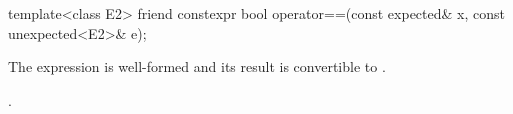 %
\begin{itemdecl}
template<class E2>
  friend constexpr bool operator==(const expected& x, const unexpected<E2>& e);
\end{itemdecl}

\begin{itemdescr}
\pnum
\mandates
The expression  is well-formed and its result is convertible to .

\pnum
\returns
{}.
\end{itemdescr}
